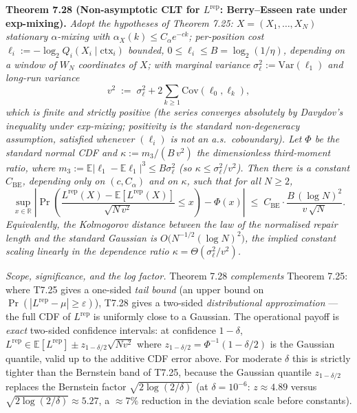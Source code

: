 \documentclass[
]{article}
\begin{document}
\textbf{Theorem 7.28 (Non-asymptotic CLT for $L^{\mathrm{rep}}$:
Berry--Esseen rate under exp-mixing).} \emph{Adopt the hypotheses of
Theorem 7.25: $X = (X_1, \ldots, X_N)$ stationary $\alpha$-mixing with
$\alpha_X(k) \leq C_\alpha e^{-c k}$; per-position cost
$\ell_i := -\log_2 Q_i(X_i \mid \mathrm{ctx}_i)$ bounded,
$0 \leq \ell_i \leq B = \log_2(1/\eta)$, depending on a window of $W_N$
coordinates of $X$; with marginal variance
$\sigma_\ell^2 := \mathrm{Var}(\ell_1)$ and long-run variance
\[
  v^2 \;:=\; \sigma_\ell^2 + 2 \sum_{k \geq 1}
  \mathrm{Cov}(\ell_0, \ell_k) ,
\]
which is finite and strictly positive (the series converges absolutely
by Davydov's inequality under exp-mixing; positivity is the standard
non-degeneracy assumption, satisfied whenever $(\ell_i)$ is not an
a.s.\ coboundary). Let $\Phi$ be the standard normal CDF and
$\kappa := m_3 / (B\, v^2)$ the dimensionless third-moment ratio, where
$m_3 := \mathbb{E}|\ell_1 - \mathbb{E}\ell_1|^3 \leq B \sigma_\ell^2$
(so $\kappa \leq \sigma_\ell^2 / v^2$). Then there is a constant
$C_{\mathrm{BE}}$, depending only on $(c, C_\alpha)$ and on $\kappa$,
such that for all $N \geq 2$,
\[
  \sup_{x \in \mathbb{R}}
  \left|
    \Pr\!\left(
      \frac{L^{\mathrm{rep}}(X) - \mathbb{E}[L^{\mathrm{rep}}(X)]}
           {\sqrt{N\, v^2}}
      \leq x
    \right)
    - \Phi(x)
  \right|
  \;\leq\;
  C_{\mathrm{BE}} \cdot
  \frac{B \,(\log N)^2}{v \,\sqrt{N}} .
\]
Equivalently, the Kolmogorov distance between the law of the normalised
repair length and the standard Gaussian is $O\!\bigl(N^{-1/2}
(\log N)^2\bigr)$, the implied constant scaling linearly in the
dependence ratio $\kappa = \Theta(\sigma_\ell^2/v^2)$.}

\emph{Scope, significance, and the log factor.} Theorem 7.28
\emph{complements} Theorem 7.25: where T7.25 gives a one-sided
\emph{tail bound} (an upper bound on $\Pr(|L^{\mathrm{rep}} - \mu|
\geq \varepsilon)$), T7.28 gives a two-sided \emph{distributional
approximation} --- the full CDF of $L^{\mathrm{rep}}$ is uniformly
close to a Gaussian. The operational payoff is \emph{exact} two-sided
confidence intervals: at confidence $1 - \delta$,
$L^{\mathrm{rep}} \in \mathbb{E}[L^{\mathrm{rep}}] \pm
z_{1-\delta/2}\sqrt{N v^2}$ where $z_{1-\delta/2} = \Phi^{-1}(1 -
\delta/2)$ is the Gaussian quantile, valid up to the additive CDF
error above. For moderate $\delta$ this is strictly tighter than the
Bernstein band of T7.25, because the Gaussian quantile $z_{1-\delta/2}$
replaces the Bernstein factor $\sqrt{2\log(2/\delta)}$ (at
$\delta = 10^{-6}$: $z \approx 4.89$ versus $\sqrt{2\log(2/\delta)}
\approx 5.27$, a $\approx 7\%$ reduction in the deviation scale before
constants).
\end{document}
